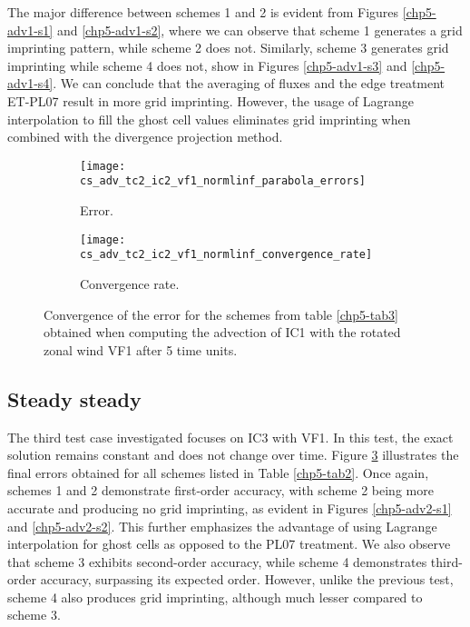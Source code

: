 The major difference between schemes 1 and 2 is evident from Figures \ref{chp5-adv1-s1} and
\ref{chp5-adv1-s2}, where we can observe that scheme 1 generates a grid imprinting pattern, 
while scheme 2 does not.
Similarly, scheme 3 generates grid imprinting while scheme 4 does not, 
show in Figures \ref{chp5-adv1-s3} and \ref{chp5-adv1-s4}.
We can conclude that the averaging of fluxes and the edge treatment ET-PL07 
result in more grid imprinting. However, the usage of Lagrange interpolation to fill the 
ghost cell values eliminates grid imprinting when combined with the divergence projection 
method.


\begin{figure}[!htb]
	\centering
	\begin{subfigure}{0.42\textwidth}
		\centering
		\texttt{[image: cs\_adv\_tc2\_ic2\_vf1\_normlinf\_parabola\_errors]}
		\caption{Error.\label{chp5-adv1-error}}
	\end{subfigure}
	\begin{subfigure}{0.42\textwidth}
		\centering
		\texttt{[image: cs\_adv\_tc2\_ic2\_vf1\_normlinf\_convergence\_rate]}
		\caption{Convergence rate.\label{chp5-adv1-cr}}
	\end{subfigure}
	\caption{Convergence of the error for the schemes from table \ref{chp5-tab3} obtained when computing the advection of IC1  with the rotated zonal wind VF1 after 5 time units.
	\label{chp5-error-adv1}}
\end{figure}



\subsection{Steady steady}
The third test case investigated focuses on IC3 with VF1. In this test, the exact solution 
remains constant and does not change over time. 
Figure \ref{chp5-error-adv1} illustrates 
the final errors obtained for all schemes listed in Table \ref{chp5-tab2}. Once again, 
schemes 1 and 2 demonstrate first-order accuracy, with scheme 2 being more accurate and 
producing no grid imprinting, as evident in Figures \ref{chp5-adv2-s1} and 
\ref{chp5-adv2-s2}. This further emphasizes the advantage of using Lagrange interpolation 
for ghost cells as opposed to the PL07 treatment.
We also observe that scheme 3 exhibits second-order accuracy, while scheme 4 demonstrates 
third-order accuracy, surpassing its expected order. However, unlike the previous test, 
scheme 4 also produces grid imprinting, although much lesser compared to scheme 3.

